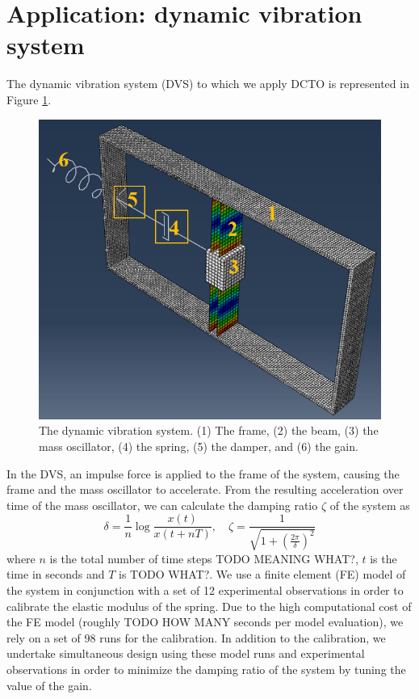 \documentclass[12pt]{article}
\begin{document}
\section{Application: dynamic vibration system}
%
The dynamic vibration system (DVS) to which we apply DCTO is represented in Figure \ref{fig:dvs}.
%
\begin{figure}
	\centering
	\includegraphics[scale=0.85]{FIG_dvs_illustration}
	\captionsetup{width=.85\linewidth}
	\caption{The dynamic vibration system. (1) The frame, (2) the beam, (3) the mass oscillator, (4) the spring, (5) the damper, and (6) the gain.}
	\label{fig:dvs}
\end{figure}
%
In the DVS, an impulse force is applied to the frame of the system, causing the frame and the mass oscillator to accelerate.
%
From the resulting acceleration over time of the mass oscillator, we can calculate the damping ratio $\zeta$ of the system as
\[
\delta = \frac1n \log\frac{x(t)}{x(t+nT)},\quad \zeta = \frac1{\sqrt{1+\left(\frac{2\pi}{\delta}\right)^2}}
\]
%
where $n$ is the total number of time steps TODO MEANING WHAT?, $t$ is the time in seconds and $T$ is TODO WHAT?.
%
We use a finite element (FE) model of the system in conjunction with a set of 12 experimental observations in order to calibrate the elastic modulus of the spring.
%
Due to the high computational cost of the FE model (roughly TODO HOW MANY seconds per model evaluation), we rely on a set of 98 runs for the calibration.
%
In addition to the calibration, we undertake simultaneous design using these model runs and experimental observations in order to minimize the damping ratio of the system by tuning the value of the gain.
%
\end{document}
